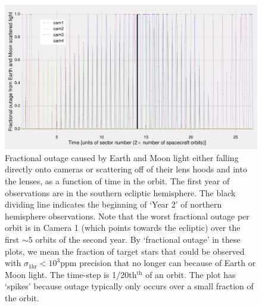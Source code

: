 \begin{figure}[!tb]
	\centering
	\includegraphics[angle=90,width=\textwidth]{figures/outage_earth_moon_primary.pdf}
	\caption{Fractional outage caused by Earth and Moon light either falling directly onto \tesss cameras or scattering off of their lens hoods and into the lenses, as a function of time in the orbit. The first year of observations are in the southern ecliptic hemisphere. The black dividing line indicates the beginning of `Year 2' of northern hemisphere observations. Note that the worst fractional outage per orbit is in Camera 1 (which points towards the ecliptic) over the first $\sim 5$ orbits of the second year.
	By `fractional outage' in these plots, we mean the fraction of target stars that could be observed with $\sigma_\mathrm{1hr} < 10^3\mathrm{ppm}$ precision that no longer can because of Earth or Moon light. 
	The time-step is 1/20th$^\mathrm{th}$ of an orbit.
	The plot has `spikes' because outage typically only occurs over a small fraction of the orbit.}
	\label{fig:earth_moon_primary}
\end{figure}
